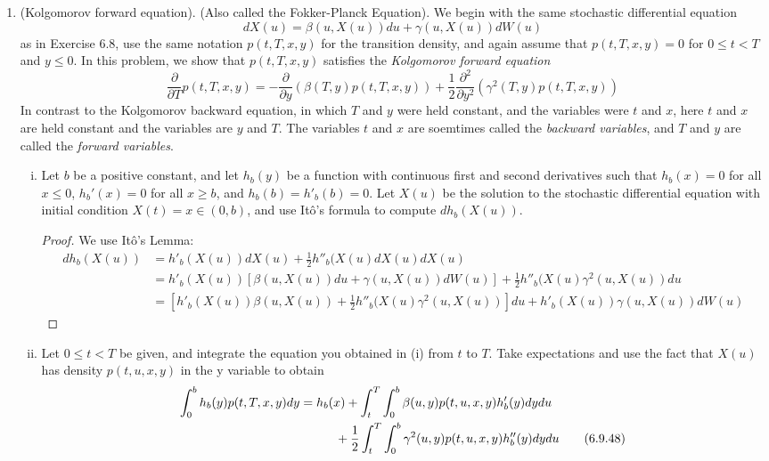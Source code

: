 \documentclass{article}
\makeatletter
\newcommand{\mylabel}[2]{#2\def\@currentlabel{#2}\label{#1}}
\newcommand{\pr}[1]{ \item[\mylabel{}{#1.}]}
\theoremstyle{definition}
\theoremstyle{definition}
\makeatother
\begin{document}
\begin{enumerate}
\pr{6.9} (Kolgomorov forward equation). (Also called the Fokker-Planck Equation). We begin with the same stochastic differential equation
$$ dX(u) = \beta(u,X(u))du + \gamma(u,X(u))dW(u)$$
as in Exercise 6.8, use the same notation $p(t,T,x,y)$ for the transition density, and again assume that $p(t,T,x,y)=0$ for $0 \le t < T$ and $y\le 0$. In this problem, we show that $p(t,T,x,y)$ satisfies the \textit{Kolgomorov forward equation}
\begin{equation}
    \frac{\partial}{\partial T}p(t,T,x,y) = -\frac{\partial}{\partial y}\left( \beta(T,y) p(t,T,x,y)\right)+ \frac{1}{2}\frac{\partial^2}{\partial y^2}\left( \gamma^2(T,y) p(t,T,x,y)\right) \tag{6.9.47}
\end{equation}
In contrast to the Kolgomorov backward equation, in which $T$ and $y$ were held constant, and the variables were $t$ and $x$, here $t$ and $x$ are held constant and the variables are $y$ and $T$. The variables $t$ and $x$ are soemtimes called the \textit{backward variables}, and $T$ and $y$ are called the \textit{forward variables}.
\begin{enumerate}[(i)]
    \item Let $b$ be a positive constant, and let $h_b(y)$ be a function with continuous first and second derivatives such that $h_b(x)=0$ for all $x \leq 0$, $h_b'(x)=0$ for all $x \geq b$, and $h_b(b)=h'_b(b)=0$. Let $X(u)$ be the solution to the stochastic differential equation with initial condition $X(t) = x \in (0,b)$, and use It\^{o}'s formula to compute $dh_b(X(u))$.
    
    \begin{proof}
        We use It\^{o}'s Lemma:
        \begin{align*}
            dh_b(X(u)) &= h'_b(X(u))dX(u) + \frac{1}{2}h''_b(X(u) dX(u)dX(u) \\
            &= h'_b(X(u))\left[ \beta(u,X(u))du + \gamma(u,X(u))dW(u) \right] +  \frac{1}{2}h''_b(X(u) \gamma^2(u,X(u))du \\
            &= \left[  h'_b(X(u))\beta(u,X(u)) +  \frac{1}{2}h''_b(X(u) \gamma^2(u,X(u)) \right]du + h'_b(X(u))\gamma(u,X(u))dW(u) 
        \end{align*}
    \end{proof}
    
    \item Let $0 \leq t < T$ be given, and integrate the equation you obtained in (i) from $t$ to $T$. Take expectations and use the fact that $X(u)$ has density $p(t,u,x,y)$ in the y variable to obtain
    \begin{align}
        \int_0^b h_b(y) p(t,T,x,y) dy &= h_b(x) + \int_t^T \int_0^b \beta(u,y)p(t,u,x,y) h_b'(y) dy du  \notag \\
        & \hspace{1cm} + \frac{1}{2}\int_t^T \int_0^b \gamma^2(u,y) p(t,u,x,y)h_b''(y) dy du \tag{6.9.48}
    \end{align}
    

\end{enumerate}
\end{enumerate}
\end{document}
